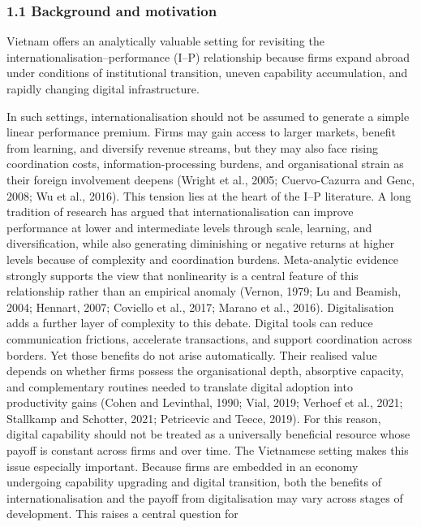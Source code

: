 \documentclass[12pt,a4paper]{article}
\begin{document}
\hypertarget{11-background-and-motivation}{%
\subsubsection{1.1 Background and
motivation}\label{11-background-and-motivation}}

Vietnam offers an analytically valuable setting for revisiting the
internationalisation--performance (I--P) relationship because firms
expand abroad under conditions of institutional transition, uneven
capability accumulation, and rapidly changing digital infrastructure.

In such settings, internationalisation should not be assumed to generate
a simple linear performance premium. Firms may gain access to larger
markets, benefit from learning, and diversify revenue streams, but they
may also face rising coordination costs, information-processing burdens,
and organisational strain as their foreign involvement deepens (Wright
et al., 2005; Cuervo-Cazurra and Genc, 2008; Wu et al., 2016). This
tension lies at the heart of the I--P literature. A long tradition of
research has argued that internationalisation can improve performance at
lower and intermediate levels through scale, learning, and
diversification, while also generating diminishing or negative returns
at higher levels because of complexity and coordination burdens.
Meta-analytic evidence strongly supports the view that nonlinearity is a
central feature of this relationship rather than an empirical anomaly
(Vernon, 1979; Lu and Beamish, 2004; Hennart, 2007; Coviello et al.,
2017; Marano et al., 2016). Digitalisation adds a further layer of
complexity to this debate. Digital tools can reduce communication
frictions, accelerate transactions, and support coordination across
borders. Yet those benefits do not arise automatically. Their realised
value depends on whether firms possess the organisational depth,
absorptive capacity, and complementary routines needed to translate
digital adoption into productivity gains (Cohen and Levinthal, 1990;
Vial, 2019; Verhoef et al., 2021; Stallkamp and Schotter, 2021;
Petricevic and Teece, 2019). For this reason, digital capability should
not be treated as a universally beneficial resource whose payoff is
constant across firms and over time. The Vietnamese setting makes this
issue especially important. Because firms are embedded in an economy
undergoing capability upgrading and digital transition, both the
benefits of internationalisation and the payoff from digitalisation may
vary across stages of development. This raises a central question for
\end{document}
